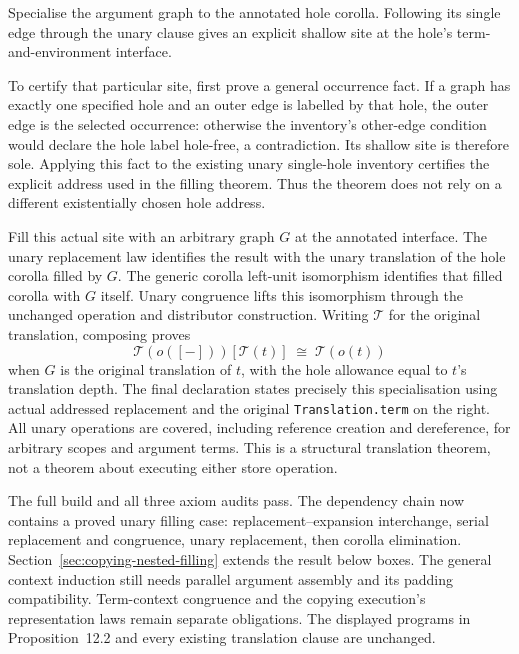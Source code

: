 



Specialise the argument graph to the annotated hole corolla. Following its
single edge through the unary clause gives an explicit shallow site at the
hole's term-and-environment interface.

To certify that particular site, first prove a general occurrence fact.
If a graph has exactly one specified hole and an outer edge is labelled by
that hole, the outer edge is the selected occurrence: otherwise the
inventory's other-edge condition would declare the hole label hole-free,
a contradiction. Its shallow site is therefore sole. Applying this fact to
the existing unary single-hole inventory certifies the explicit address
used in the filling theorem. Thus the theorem does not rely on a different
existentially chosen hole address.







Fill this actual site with an arbitrary graph $G$ at the annotated
interface. The unary replacement law identifies the result with the unary
translation of the hole corolla filled by $G$. The generic corolla left-unit
isomorphism identifies that filled corolla with $G$ itself. Unary congruence
lifts this isomorphism through the unchanged operation and distributor
construction. Writing $\mathcal{T}$ for the original translation, composing proves
\[
  \mathcal{T}(o([-]))[\mathcal{T}(t)]
  \;\cong\;\mathcal{T}(o(t))
\]
when $G$ is the original translation of $t$, with the hole allowance equal
to $t$'s translation depth. The final declaration states precisely this
specialisation using actual addressed replacement and the original
\texttt{Translation.term} on the right. All unary operations are covered,
including reference creation and dereference, for arbitrary scopes and
argument terms. This is a structural translation theorem, not a theorem
about executing either store operation.





The full build and all three axiom audits pass. The dependency chain now
contains a proved unary filling case:
replacement--expansion interchange, serial replacement and congruence,
unary replacement, then corolla elimination. Section~\ref{sec:copying-nested-filling} extends the result below boxes.
The general context induction still needs parallel argument assembly
and its padding compatibility. Term-context congruence and the copying
execution's representation laws remain separate obligations. The displayed
programs in Proposition~12.2 and every existing translation clause are unchanged.
